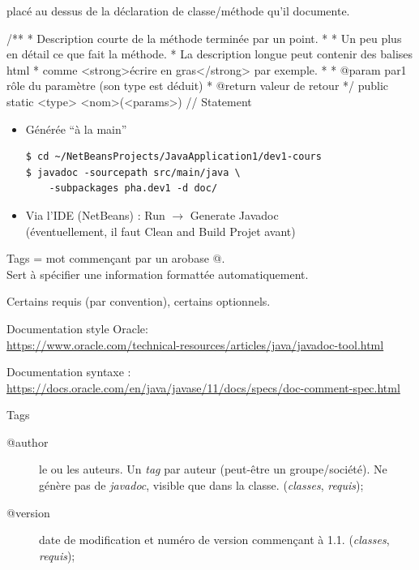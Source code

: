 \begin{hideedit}
\begin{frame}[fragile]{}
  \pause
   placé \alert{au dessus} de la déclaration
  de classe/méthode qu'il documente.
\end{frame}

\begin{frame}[fragile]{}
  \begin{java}
/**
 * Description courte de la méthode terminée par un point.
 *
 * Un peu plus en détail ce que fait la méthode.
 * La description longue peut contenir des balises html
 * comme <strong>écrire en gras</strong> par exemple.
 *
 * @param par1 rôle du paramètre (son type est déduit)
 * @return valeur de retour
 */
public static <type> <nom>(<params>) {
    // Statement
}
  \end{java}
\end{frame}

\begin{frame}[fragile]{}
  \begin{itemize}
    \item Générée ``à la main''
      \begin{verbatim}
$ cd ~/NetBeansProjects/JavaApplication1/dev1-cours
$ javadoc -sourcepath src/main/java \
    -subpackages pha.dev1 -d doc/
      \end{verbatim}
    \item Via l'IDE (NetBeans) : Run \(\rightarrow\) Generate Javadoc\\
      (éventuellement, il faut Clean and Build Projet avant)
  \end{itemize}
\end{frame}

\begin{frame}{Tags}
   = mot commençant par un arobase @.\\
  Sert à spécifier une information formattée automatiquement.

  \pause
  Certains requis (par convention), certains optionnels.

  Documentation style Oracle:\\
  \url{https://www.oracle.com/technical-resources/articles/java/javadoc-tool.html}

  Documentation syntaxe :\\
  \url{https://docs.oracle.com/en/java/javase/11/docs/specs/doc-comment-spec.html}
\end{frame}
\begin{frame}{Tags}
  \begin{description}
    \item[@author] le ou les auteurs. Un \textit{tag}
      par auteur (peut-être un groupe/société). Ne génère pas
      de \textit{javadoc}, visible que dans la classe.
      (\textit{classes}, \textit{requis});
    \item[@version] date de modification et numéro de version
      commençant à 1.1.  (\textit{classes}, \textit{requis});


\end{description}
\end{frame}
\end{hideedit}
